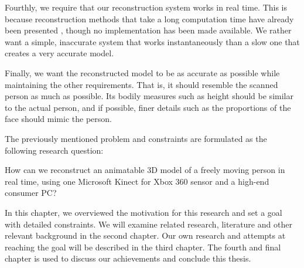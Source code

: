 Fourthly, we require that our reconstruction system works in real time. This is because reconstruction methods that take a long computation time have already been presented \citep{weiss2011home}, though no implementation has been made available. We rather want a simple, inaccurate system that works instantaneously than a slow one that creates a very accurate model.

Finally, we want the reconstructed model to be as accurate as possible while maintaining the other requirements. That is, it should resemble the scanned person as much as possible. Its bodily measures such as height should be similar to the actual person, and if possible, finer details such as the proportions of the face should mimic the person.

The previously mentioned problem and constraints are formulated as the following research question:

How can we reconstruct an animatable 3D model of a freely moving person in real time, using one Microsoft Kinect for Xbox 360 sensor and a high-end consumer PC?

\newtopic

In this chapter, we overviewed the motivation for this research and set a goal with detailed constraints. We will examine related research, literature and other relevant background in the second chapter. Our own research and attempts at reaching the goal will be described in the third chapter. The fourth and final chapter is used to discuss our achievements and conclude this thesis.
